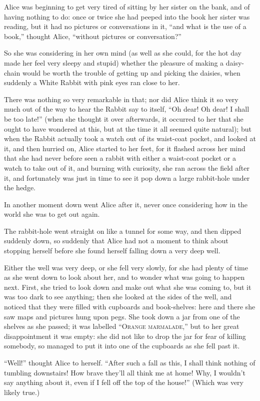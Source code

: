 \documentclass[a4paper]{article}
\begin{document}
Alice was beginning to get very tired of sitting by her
sister on the bank, and of having nothing to do: once or
twice she had peeped into the book her sister was reading,
but it had no pictures or conversations in it, ``and what is
the use of a book,'' thought Alice, ``without pictures or
conversation?''

So she was considering in her own mind (as well as she
could, for the hot day made her feel very sleepy and stupid)
whether the pleasure of making a daisy-chain would be worth
the trouble of getting up and picking the daisies, when
suddenly a White Rabbit with pink eyes ran close to her.

There was nothing so very remarkable in that; nor did Alice
think it so very much out of the way to hear the Rabbit say
to itself, ``Oh dear! Oh dear! I shall be too late!'' (when
she thought it over afterwards, it occurred to her that she
ought to have wondered at this, but at the time it all
seemed quite natural); but when the Rabbit actually took a
watch out of its waist-coat pocket, and looked at it, and
then hurried on, Alice started to her feet, for it flashed
across her mind that she had never before seen a rabbit with
either a waist-coat pocket or a watch to take out of it, and
burning with curiosity, she ran across the field after it,
and fortunately was just in time to see it pop down a large
rabbit-hole under the hedge.

In another moment down went Alice after it, never once
considering how in the world she was to get out again.

The rabbit-hole went straight on like a tunnel for some way,
and then dipped suddenly down, so suddenly that Alice had
not a moment to think about stopping herself before she
found herself falling down a very deep well.

Either the well was very deep, or she fell very slowly, for
she had plenty of time as she went down to look about her,
and to wonder what was going to happen next. First, she
tried to look down and make out what she was coming to, but
it was too dark to see anything; then she looked at the
sides of the well, and noticed that they were filled with
cupboards and book-shelves: here and there she saw maps and
pictures hung upon pegs. She took down a jar from one of the
shelves as she passed; it was labelled ``\textsc{Orange
  marmalade},'' but to her great disappointment it was
empty: she did not like to drop the jar for fear of killing
somebody, so managed to put it into one of the cupboards as
she fell past it.

``Well!'' thought Alice to herself. ``After such a fall as
this, I shall think nothing of tumbling downstairs! How
brave they'll all think me at home! Why, I wouldn't say
anything about it, even if I fell off the top of the house!''
(Which was very likely true.)
\end{document}
